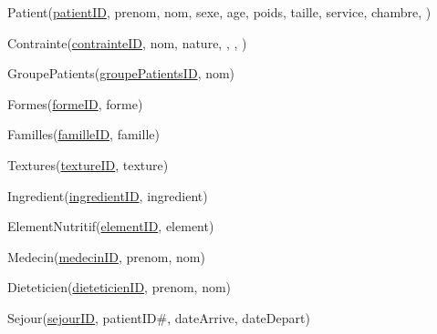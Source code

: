 Patient(\underline{patientID}, prenom, nom, sexe, age, poids, taille, service, chambre, )

Contrainte(\underline{contrainteID}, nom, nature, , , )


GroupePatients(\underline{groupePatientsID}, nom)

Formes(\underline{formeID}, forme)

Familles(\underline{familleID}, famille)

Textures(\underline{textureID}, texture)

Ingredient(\underline{ingredientID}, ingredient)



ElementNutritif(\underline{elementID}, element)



Medecin(\underline{medecinID}, prenom, nom)

Dieteticien(\underline{dieteticienID}, prenom, nom)


Sejour(\underline{sejourID}, patientID\#, dateArrive, dateDepart)


